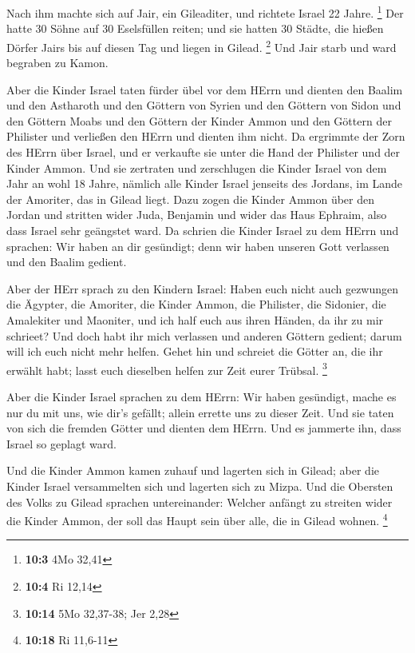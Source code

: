  Nach ihm machte sich auf Jair, ein Gileaditer, und richtete
Israel 22 Jahre. \footnote{\textbf{10:3} 4Mo 32,41}  Der
hatte 30 Söhne auf 30 Eselsfüllen reiten; und sie hatten 30 Städte, die
hießen Dörfer Jairs bis auf diesen Tag und liegen in Gilead. \footnote{\textbf{10:4}
  Ri 12,14}  Und Jair starb und ward begraben zu Kamon.

 Aber die Kinder Israel taten fürder übel vor dem HErrn und
dienten den Baalim und den Astharoth und den Göttern von Syrien und den
Göttern von Sidon und den Göttern Moabs und den Göttern der Kinder Ammon
und den Göttern der Philister und verließen den HErrn und dienten ihm
nicht.  Da ergrimmte der Zorn des HErrn über Israel, und er
verkaufte sie unter die Hand der Philister und der Kinder Ammon.
 Und sie zertraten und zerschlugen die Kinder Israel von dem
Jahr an wohl 18 Jahre, nämlich alle Kinder Israel jenseits des Jordans,
im Lande der Amoriter, das in Gilead liegt.  Dazu zogen die
Kinder Ammon über den Jordan und stritten wider Juda, Benjamin und wider
das Haus Ephraim, also dass Israel sehr geängstet ward.  Da
schrien die Kinder Israel zu dem HErrn und sprachen: Wir haben an dir
gesündigt; denn wir haben unseren Gott verlassen und den Baalim gedient.

 Aber der HErr sprach zu den Kindern Israel: Haben euch
nicht auch gezwungen die Ägypter, die Amoriter, die Kinder Ammon, die
Philister,  die Sidonier, die Amalekiter und Maoniter, und
ich half euch aus ihren Händen, da ihr zu mir schrieet? 
Und doch habt ihr mich verlassen und anderen Göttern gedient; darum will
ich euch nicht mehr helfen.  Gehet hin und schreiet die
Götter an, die ihr erwählt habt; lasst euch dieselben helfen zur Zeit
eurer Trübsal. \footnote{\textbf{10:14} 5Mo 32,37-38; Jer 2,28}

 Aber die Kinder Israel sprachen zu dem HErrn: Wir haben
gesündigt, mache es nur du mit uns, wie dir's gefällt; allein errette
uns zu dieser Zeit.  Und sie taten von sich die fremden
Götter und dienten dem HErrn. Und es jammerte ihn, dass Israel so
geplagt ward.

 Und die Kinder Ammon kamen zuhauf und lagerten sich in
Gilead; aber die Kinder Israel versammelten sich und lagerten sich zu
Mizpa.  Und die Obersten des Volks zu Gilead sprachen
untereinander: Welcher anfängt zu streiten wider die Kinder Ammon, der
soll das Haupt sein über alle, die in Gilead wohnen. \footnote{\textbf{10:18}
  Ri 11,6-11}

